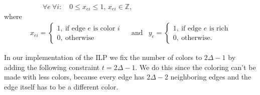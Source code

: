 \documentclass[12pt,a4paper]{amsart}
\theoremstyle{definition} %
\theoremstyle{plain} %
\newcommand{\Z}{\mathbb Z}
\begin{document}
        \ \ \ \ \ \ \ \ \ \ \ $\forall e \ \forall i: \quad 0 \leq x_{ei} \leq 1$, $x_{ei} \in \Z$,\\

        where
        \begin{align*} x_{ei} = 
            \begin{cases}
                1, \  \text{if edge $e$ is color $i$} \\
                0, \  \text{otherwise}
            \end{cases} \ \ & \text{and} & 
                y_{e} = 
            \begin{cases}
                1, \  \text{if edge $e$ is rich} \\
                0, \  \text{otherwise.}
            \end{cases}
        \end{align*}

        In our implementation of the ILP we fix the number of colors to $2 \Delta - 1$ by adding the following constraint $t = 2\Delta - 1$. We do this since the coloring can't be made with less colors, because every edge has $2 \Delta - 2$ neighboring edges and the edge itself has to be a different color. 
        
        \begin{center}
        \end{center}
\end{document}

